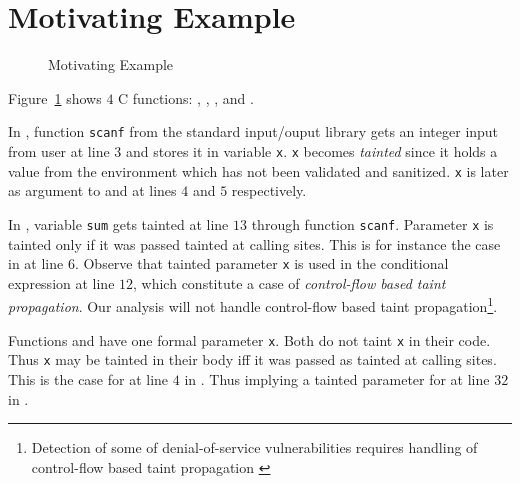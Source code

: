 \section{Motivating Example}\label{sec:example} 

\begin{figure}
\begin{center}
\end{center}
\caption{Motivating Example}
\label{fig:sample}
\end{figure}

Figure~\ref{fig:sample} shows $4$ C functions:
\main, \even, \odd, and \compute.

In \main{}, function \texttt{scanf} from the standard input/ouput
library gets an integer input from user at line $3$
and stores it in variable \texttt{x}. \texttt{x} 
becomes \textit{tainted} since it holds a value from
the environment which has not been validated and
sanitized.
\texttt{x} is later as argument to \even{} and \odd{} at
lines $4$ and $5$ respectively.

In \compute{}, variable \texttt{sum} gets tainted at
line $13$ through function \texttt{scanf}. Parameter
\texttt{x} is tainted only if it was passed tainted
at calling sites.
This is for instance the case in \main{} at line $6$.
Observe that tainted parameter \texttt{x} is used in
the conditional expression at line $12$, which constitute
a case of \textit{control-flow based taint propagation}.
Our analysis will not handle control-flow based taint
propagation\footnote{Detection of some of denial-of-service
vulnerabilities requires handling of control-flow based
taint propagation \cite{Chang:2009:ICS}}. 

Functions \even{} and \odd{} have one formal parameter
\texttt{x}. Both do not taint \texttt{x} in their code.
Thus \texttt{x} may be tainted in their body iff it was
passed as tainted at calling sites. This is the case
for \even{} at line $4$ in \main{}. Thus implying a tainted
parameter for \odd{} at line $32$ in \even{}.